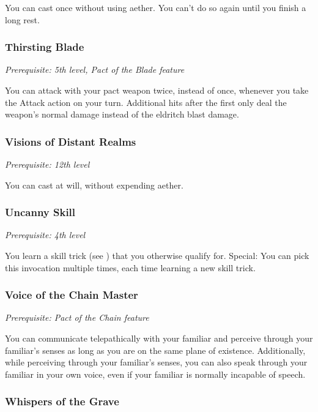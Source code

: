 You can cast  once without using aether. You can't do so again until you finish a long rest.

\subsubsection{Thirsting Blade}

\textit{Prerequisite: 5th level, Pact of the Blade feature}

You can attack with your pact weapon twice, instead of once, whenever you take the Attack action on your turn. Additional hits after the first only deal the weapon's normal damage instead of the eldritch blast damage.

\subsubsection{Visions of Distant Realms}

\textit{Prerequisite: 12th level}

You can cast  at will, without expending aether.

\subsubsection{Uncanny Skill}
\textit{Prerequisite: 4th level}

You learn a skill trick (see ) that you otherwise qualify for. Special: You can pick this invocation multiple times, each time learning a new skill trick.

\subsubsection{Voice of the Chain Master}

\textit{Prerequisite: Pact of the Chain feature}

You can communicate telepathically with your familiar and perceive through your familiar's senses as long as you are on the same plane of existence. Additionally, while perceiving through your familiar's senses, you can also speak through your familiar in your own voice, even if your familiar is normally incapable of speech.

\subsubsection{Whispers of the Grave}

